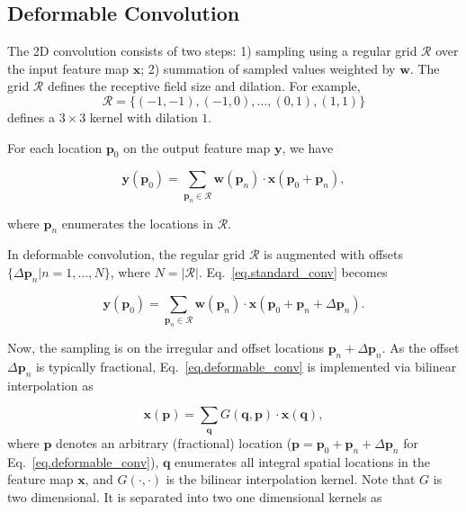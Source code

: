 \documentclass[10pt,twocolumn,letterpaper]{article}
\begin{document}
\subsection{Deformable Convolution}
\label{sec.deformable_convolution}
The 2D convolution consists of two steps: 1) sampling using a regular grid $\mathcal{R}$ over the input feature map $\mathbf{x}$; 2)  summation of sampled values weighted by $\mathbf{w}$. The grid $\mathcal{R}$ defines the receptive field size and dilation. For example, 
\[
\mathcal{R}=\{(-1, -1), (-1, 0), \ldots, (0,1), (1, 1)\}
\]
defines a $3 \times 3$ kernel with dilation $1$.

For each location $\mathbf{p}_0$ on the output feature map $\mathbf{y}$,  we have

\begin{equation}
\mathbf{y}(\mathbf{p}_0)=\sum_{\mathbf{p}_n\in\mathcal{R}}\mathbf{w}(\mathbf{p}_n)\cdot \mathbf{x}(\mathbf{p}_0+\mathbf{p}_n),
\label{eq.standard_conv}
\end{equation}

where $\mathbf{p}_n$ enumerates the locations in $\mathcal{R}$.

In deformable convolution, the regular grid $\mathcal{R}$ is augmented with offsets $\{\Delta \mathbf{p}_n|n=1,...,N\}$, where $N=|\mathcal{R}|$. Eq.~\eqref{eq.standard_conv} becomes

\begin{equation}
\mathbf{y}(\mathbf{p}_0)=\sum_{\mathbf{p}_n\in\mathcal{R}}\mathbf{w}(\mathbf{p}_n)\cdot \mathbf{x}(\mathbf{p}_0+\mathbf{p}_n+\Delta \mathbf{p}_n).
\label{eq.deformable_conv}
\end{equation}

Now, the sampling is on the irregular and offset locations $\mathbf{p}_n+\Delta \mathbf{p}_n$. As the offset $\Delta \mathbf{p}_n$ is typically fractional, Eq.~\eqref{eq.deformable_conv} is implemented via bilinear interpolation as

\begin{equation}
\mathbf{x}(\mathbf{p})=\sum_\mathbf{q} G(\mathbf{q},\mathbf{p})\cdot \mathbf{x}(\mathbf{q}),
\label{eq.bilinear_interpolation}
\end{equation}
where $\mathbf{p}$ denotes an arbitrary (fractional) location ($\mathbf{p}=\mathbf{p}_0+\mathbf{p}_n+\Delta \mathbf{p}_n$ for Eq.~\eqref{eq.deformable_conv}), $\mathbf{q}$ enumerates all integral spatial locations in the feature map $\mathbf{x}$, and $G(\cdot,\cdot)$ is the bilinear interpolation kernel. Note that $G$ is two dimensional. It is separated into two one dimensional kernels as
\end{document}
